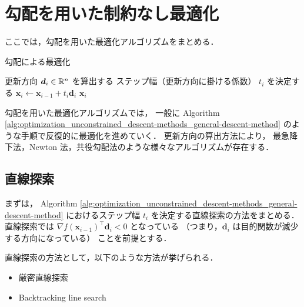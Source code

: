 %

\chapter{勾配を用いた制約なし最適化}
\label{chap:optimization_unconstrained_descent-methods}

ここでは，勾配を用いた最適化アルゴリズムをまとめる．

\begin{algorithm}[tp]
    \caption{勾配による最適化}
    \label{alg:optimization_unconstrained_descent-methods_general-descent-method}
    \begin{algorithmic}
        \State 更新方向 $\bm{d}_i \in \mathbb{R}^n$ を算出する
        \State ステップ幅（更新方向に掛ける係数） $t_i$ を決定する
        \State $\bm{x}_i \gets \bm{x}_{i-1} + t_i \bm{d}_i$
        \State \Return $\bm{x}_i$
        \EndIf
        \EndFor
        \EndProcedure
    \end{algorithmic}
\end{algorithm}

勾配を用いた最適化アルゴリズムでは，
一般に
Algorithm \ref{alg:optimization_unconstrained_descent-methods_general-descent-method}
のような手順で反復的に最適化を進めていく．
更新方向の算出方法により，
最急降下法，Newton 法，共役勾配法のような様々なアルゴリズムが存在する．

\section{直線探索}
\label{sec:optimization_unconstrained_descent-methods_line-search}

まずは，
Algorithm \ref{alg:optimization_unconstrained_descent-methods_general-descent-method}
におけるステップ幅 $t_i$ を決定する直線探索の方法をまとめる．
直線探索では
$\nabla f(\bm{x}_{i-1})^\top \bm{d}_i < 0$ となっている
（つまり，$\bm{d}_i$ は目的関数が減少する方向になっている）
ことを前提とする．

直線探索の方法として，以下のような方法が挙げられる．

\begin{itemize}
    \item 厳密直線探索
    \item Backtracking line search
\end{itemize}

